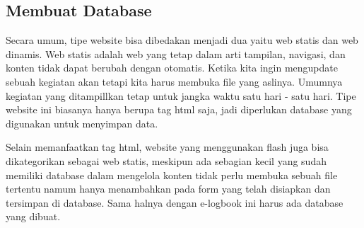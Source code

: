 \subsection{Membuat Database}
Secara umum, tipe website bisa dibedakan menjadi dua yaitu web statis dan web dinamis. Web statis adalah web yang tetap dalam arti tampilan, navigasi, dan konten tidak dapat berubah dengan otomatis. Ketika kita ingin mengupdate sebuah kegiatan akan tetapi kita harus membuka file yang aslinya. Umumnya kegiatan yang ditampillkan tetap untuk jangka waktu satu hari - satu hari. Tipe website ini biasanya hanya berupa tag html saja, jadi diperlukan database yang digunakan untuk menyimpan data.
\par
Selain memanfaatkan tag html, website yang menggunakan flash juga bisa dikategorikan sebagai web statis, meskipun ada sebagian kecil yang sudah memiliki database dalam mengelola konten tidak perlu membuka sebuah file tertentu namum hanya menambahkan pada form yang telah disiapkan dan tersimpan di database. Sama halnya dengan e-logbook ini harus ada database yang dibuat.
